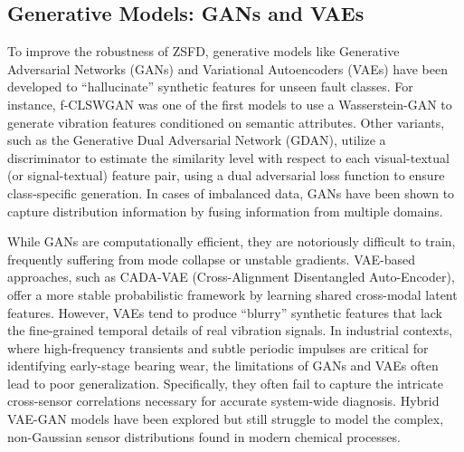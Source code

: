 \documentclass[journal]{IEEEtran}
\begin{document}
\subsection{Generative Models: GANs and VAEs}
To improve the robustness of ZSFD, generative models like Generative Adversarial Networks (GANs) and Variational Autoencoders (VAEs) have been developed to ``hallucinate'' synthetic features for unseen fault classes. For instance, f-CLSWGAN was one of the first models to use a Wasserstein-GAN to generate vibration features conditioned on semantic attributes. Other variants, such as the Generative Dual Adversarial Network (GDAN), utilize a discriminator to estimate the similarity level with respect to each visual-textual (or signal-textual) feature pair, using a dual adversarial loss function to ensure class-specific generation. In cases of imbalanced data, GANs have been shown to capture distribution information by fusing information from multiple domains.

While GANs are computationally efficient, they are notoriously difficult to train, frequently suffering from mode collapse or unstable gradients. VAE-based approaches, such as CADA-VAE (Cross-Alignment Disentangled Auto-Encoder), offer a more stable probabilistic framework by learning shared cross-modal latent features. However, VAEs tend to produce ``blurry'' synthetic features that lack the fine-grained temporal details of real vibration signals. In industrial contexts, where high-frequency transients and subtle periodic impulses are critical for identifying early-stage bearing wear, the limitations of GANs and VAEs often lead to poor generalization. Specifically, they often fail to capture the intricate cross-sensor correlations necessary for accurate system-wide diagnosis. Hybrid VAE-GAN models have been explored but still struggle to model the complex, non-Gaussian sensor distributions found in modern chemical processes.
\end{document}
